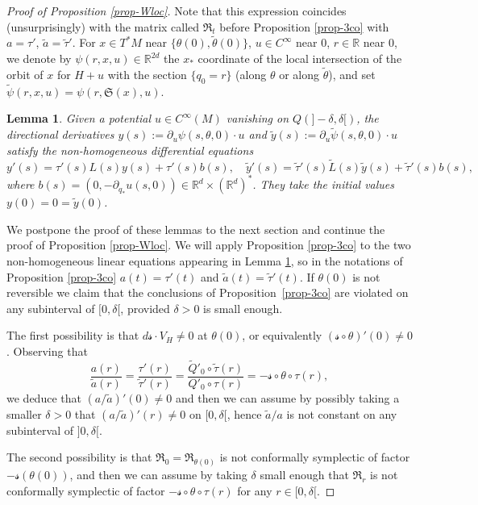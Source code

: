 \documentclass[10pt]{amsart}
\newcommand{\Rm}{\mathbb{R}}
\newcommand{\gR}{\ensuremath{\mathfrak{R}}}
\newcommand{\gS}{\ensuremath{\mathfrak{S}}}
\newcommand{\ms}{\ensuremath{\mathscr{s}}}
\theoremstyle{plain}
\newtheorem{lem}{Lemma}
\theoremstyle{definition}
\begin{document}
\begin{proof}[Proof of Proposition \ref{prop-Wloc}]
Note that this expression coincides (unsurprisingly) with the matrix called $\gR_t$ before Proposition \ref{prop-3co}
with $a =\tau'$, $\tilde a =\tilde \tau '$.
For $x\in T^*M$ near $\{\theta(0),\tilde \theta(0)\}$, $u\in C^{\infty}$ near $0$, $r\in \Rm$ near $0$, we denote by $\psi(r,x,u)\in \Rm^{2d}$ the $x_*$ coordinate of the local intersection
of the orbit of $x$ for $H+u$ with the section $\{q_0=r\}$ (along $\theta$ or along $\tilde \theta$), and set
$\tilde \psi(r,x,u)=\psi(r,\gS(x),u)$.

\begin{lem}\label{lem-diff} Given a potential $u\in C^{\infty}(M)$ vanishing on $Q(]-\delta, \delta[)$, the directional derivatives
$y(s):= \partial_{u}\psi(s,\theta, 0)\cdot u$ and $\tilde y(s):= \partial_{u}\tilde \psi(s,\theta, 0)\cdot u$ satisfy the non-homogeneous differential equations
\[
y'(s)= \tau'(s)L(s)y(s)+\tau'(s)b(s), \quad
\tilde y'(s)= \tilde \tau '(s)\tilde L(s)\tilde y(s)+\tilde \tau'(s)b(s),
\]
where $b(s)= (0,-\partial_{q_*}u(s,0))\in \Rm^d \times (\Rm^d)^*$. They take the initial values $y(0)=0=\tilde y(0)$.
\end{lem}

We postpone the proof of these lemmas to the next section and continue the proof of Proposition \ref{prop-Wloc}.
We will apply Proposition \ref{prop-3co} to the two non-homogeneous linear equations appearing in Lemma \ref{lem-diff}, so
in the notations of Proposition \ref{prop-3co} $a(t)=\tau'(t)$ and $\tilde a (t)= \tilde \tau'(t)$.
If $\theta(0)$ is not reversible
we claim that the conclusions of Proposition~\ref{prop-3co} are violated on any subinterval of $[0, \delta[$, provided $\delta>0$
is small enough.

The first possibility is that $d\ms\cdot V_H\neq 0$ at $\theta(0)$,
or equivalently $(\ms\circ \theta)'(0)\neq 0$.
Observing that
\[
\frac{a(r)}{\tilde a(r)}= \frac{\tau' (r)}{\tilde \tau'(r)}=\frac{\tilde Q'_0 \circ \tilde\tau (r)}{Q'_0\circ \tau(r)}=
-\ms\circ \theta\circ \tau(r),
\]
we deduce that $(a/\tilde a)'(0)\neq 0$ and then we can assume by possibly taking a smaller $\delta>0$ that
$(a /\tilde a)'(r)\neq 0$
on $[0, \delta[$, hence $\tilde a/a$ is not constant on any subinterval of $]0, \delta[$.

The second possibility is that $\gR_0=\gR_{\theta(0)}$ is not conformally symplectic of factor $-\ms(\theta(0))$, and then we can assume by taking $\delta$ small enough
that $\gR_r$ is not conformally symplectic of factor $-\ms\circ \theta\circ \tau(r) $ for any $r\in [0,\delta[$.


\end{proof}
\end{document}
